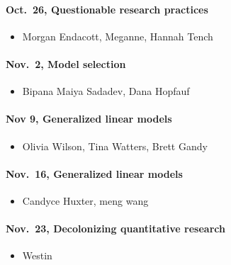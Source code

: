 \documentclass[
  letterpaper,
  DIV=11,
  numbers=noendperiod]{scrartcl}
\let\oldparagraph\paragraph
\renewcommand{\paragraph}[1]{\oldparagraph{#1}\mbox{}}
\providecommand{\tightlist}{%
  \setlength{\itemsep}{0pt}\setlength{\parskip}{0pt}}\usepackage{longtable,booktabs,array}
\begin{document}
\hypertarget{oct.-26-questionable-research-practices}{%
\paragraph{Oct.~26, Questionable research
practices}\label{oct.-26-questionable-research-practices}}

\begin{itemize}
\tightlist
\item
  Morgan Endacott, Meganne, Hannah Tench
\end{itemize}

\hypertarget{nov.-2-model-selection}{%
\paragraph{Nov.~2, Model selection}\label{nov.-2-model-selection}}

\begin{itemize}
\tightlist
\item
  Bipana Maiya Sadadev, Dana Hopfauf
\end{itemize}

\hypertarget{nov-9-generalized-linear-models}{%
\paragraph{Nov 9, Generalized linear
models}\label{nov-9-generalized-linear-models}}

\begin{itemize}
\tightlist
\item
  Olivia Wilson, Tina Watters, Brett Gandy
\end{itemize}

\hypertarget{nov.-16-generalized-linear-models}{%
\paragraph{Nov.~16, Generalized linear
models}\label{nov.-16-generalized-linear-models}}

\begin{itemize}
\tightlist
\item
  Candyce Huxter, meng wang
\end{itemize}

\hypertarget{nov.-23-decolonizing-quantitative-research}{%
\paragraph{Nov.~23, Decolonizing quantitative
research}\label{nov.-23-decolonizing-quantitative-research}}

\begin{itemize}
\tightlist
\item
  Westin
\end{itemize}
\end{document}
